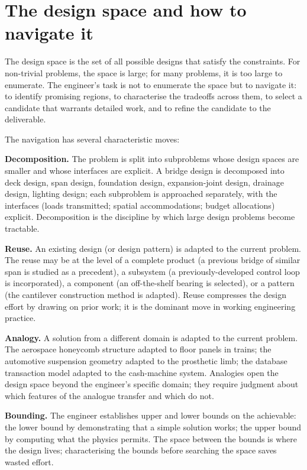 \section{The design space and how to navigate it}

The design space is the set of all possible designs that satisfy the constraints. For non-trivial problems, the space is large; for many problems, it is too large to enumerate. The engineer's task is not to enumerate the space but to navigate it: to identify promising regions, to characterise the tradeoffs across them, to select a candidate that warrants detailed work, and to refine the candidate to the deliverable.

The navigation has several characteristic moves:

\textbf{Decomposition.} The problem is split into subproblems whose design spaces are smaller and whose interfaces are explicit. A bridge design is decomposed into deck design, span design, foundation design, expansion-joint design, drainage design, lighting design; each subproblem is approached separately, with the interfaces (loads transmitted; spatial accommodations; budget allocations) explicit. Decomposition is the discipline by which large design problems become tractable.

\textbf{Reuse.} An existing design (or design pattern) is adapted to the current problem. The reuse may be at the level of a complete product (a previous bridge of similar span is studied as a precedent), a subsystem (a previously-developed control loop is incorporated), a component (an off-the-shelf bearing is selected), or a pattern (the cantilever construction method is adapted). Reuse compresses the design effort by drawing on prior work; it is the dominant move in working engineering practice.

\textbf{Analogy.} A solution from a different domain is adapted to the current problem. The aerospace honeycomb structure adapted to floor panels in trains; the automotive suspension geometry adapted to the prosthetic limb; the database transaction model adapted to the cash-machine system. Analogies open the design space beyond the engineer's specific domain; they require judgment about which features of the analogue transfer and which do not.

\textbf{Bounding.} The engineer establishes upper and lower bounds on the achievable: the lower bound by demonstrating that a simple solution works; the upper bound by computing what the physics permits. The space between the bounds is where the design lives; characterising the bounds before searching the space saves wasted effort.

